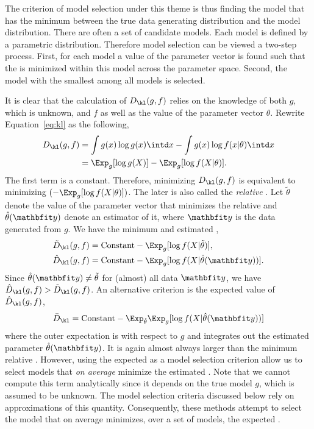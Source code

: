 The criterion of model selection under this theme is thus finding the model
that has the minimum \kld between the true data generating distribution and
the model distribution. There are often a set of candidate models. Each model
is defined by a parametric distribution. Therefore model selection can be
viewed a two-step process. First, for each model a value of the parameter
vector is found such that the \kld is minimized within this model across the
parameter space. Second, the model with the smallest \kld among all models is
selected.

It is clear that the calculation of $D_{\kl}(g,f)$ relies on the knowledge of
both $g$, which is unknown, and $f$ as well as the value of the parameter
vector $\theta$. Rewrite Equation~\eqref{eq:kl} as the following,
\begin{align}
  D_{\kl}(g,f)
  &= \int g(x)\log g(x) \intd x - \int g(x) \log f(x|\theta) \intd x \notag\\
  &= \Exp_g[\log g(X)] - \Exp_g[\log f(X|\theta)].
\end{align}
The first term is a constant. Therefore, minimizing $D_{\kl}(g,f)$ is
equivalent to minimizing $(-\Exp_g[\log f(X|\theta)])$. The later is also
called the \emph{relative} \kldfull. Let $\tilde\theta$ denote the value of
the parameter vector that minimizes the relative \kld and $\hat\theta(\data)$
denote an estimator of it, where $\data$ is the data generated from $g$. We
have the minimum and estimated \kld,
\begin{align}
  \tilde{D}_{\kl}(g,f) &= \text{Constant} - \Exp_g[\log f(X|\tilde\theta)], \\
  \hat{D}_{\kl}(g,f) &= \text{Constant} - \Exp_g[\log f(X|\hat\theta(\data))].
\end{align}
Since $\hat\theta(\data)\ne\tilde\theta$ for (almost) all data $\data$, we
have $\hat{D}_{\kl}(g,f) > \tilde{D}_{\kl}(g,f)$. An alternative criterion is
the expected value of $\hat{D}_{\kl}(g,f)$,
\begin{equation}
  \bar{D}_{\kl} = \text{Constant} -
  \Exp_{\hat\theta}\Exp_g[\log f(X|\hat\theta(\data))]
  \label{eq:expected kl}
\end{equation}
where the outer expectation is with respect to $g$ and integrates out the
estimated parameter $\hat\theta(\data)$. It is again almost always larger than
the minimum relative \kld. However, using the expected \kld as a model
selection criterion allow us to select models that \emph{on average} minimize
the estimated \kld. Note that we cannot compute this term analytically since
it depends on the true model $g$, which is assumed to be unknown. The model
selection criteria discussed below rely on approximations of this quantity.
Consequently, these methods attempt to select the model that on average
minimizes, over a set of models, the expected \kld.

